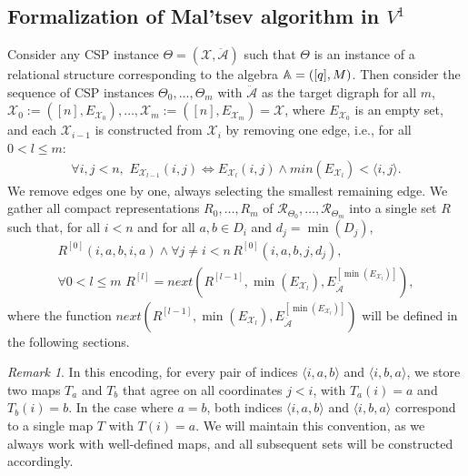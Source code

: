 \documentclass{article}
\newcommand{\A}{\ensuremath\mathbb{A}}
\theoremstyle{definition}
\theoremstyle{theorem}
\theoremstyle{theorem}
\theoremstyle{remark}
\theoremstyle{remark}
\newtheorem{rem}{Remark}
\theoremstyle{example}
\theoremstyle{notation}
\theoremstyle{theorem}
\begin{document}
\subsection{Formalization of Mal'tsev algorithm in $V^1$}\label{alskhf;shgf}

Consider any CSP instance $\Theta=(\mathcal{X},\ddot{\mathcal{A}})$ such that $\Theta$ is an instance of a relational structure corresponding to the algebra $\A=([q], M)$. Then consider the sequence of CSP instances $\Theta_0, \ldots, \Theta_m$ with $\ddot{\mathcal{A}}$ as the target digraph for all $m$,
$\mathcal{X}_0:=([n], E_{\mathcal{X}_0}), \ldots, \mathcal{X}_m:=([n], E_{\mathcal{X}_m}) = \mathcal{X}$, where $E_{\mathcal{X}_0}$ is an empty set, and each $\mathcal{X}_{i-1}$ is constructed from $\mathcal{X}_{i}$ by removing one edge, i.e., for all $0 < l \leq m$:
\begin{equation}
    \begin{gathered}
        \forall i,j<n, \,\, E_{\mathcal{X}_{l-1}}(i,j) \iff E_{\mathcal{X}_{l}}(i,j) \wedge min(E_{\mathcal{X}_l}) < \langle i,j\rangle.
    \end{gathered}
\end{equation}
We remove edges one by one, always selecting the smallest remaining edge. We gather all compact representations $R_0, \ldots, R_m$ of $\mathscr{R}_{\Theta_0}, \ldots, \mathscr{R}_{\Theta_m}$ into a single set $R$ such that, for all $i < n$ and for all $a, b \in D_i$ and $d_j = \min(D_j)$,
\begin{equation}
    \begin{gathered}\label{askjfh;ashfd}
R^{[0]}(i, a,b ,i,a)\wedge \forall j \neq i < n \, R^{[0]}( i, a,b,j,d_j), \\
\forall 0 < l \leq m\,\, R^{[l]} = next(R^{[l-1]}, \min(E_{\mathcal{X}_l}), E^{[\min(E_{\mathcal{X}_l})]}_{\ddot{\mathcal{A}}}),
    \end{gathered}
\end{equation}
where the function $next(R^{[l-1]}, \min(E_{\mathcal{X}_l}), E^{[\min(E_{\mathcal{X}_l})]}_{\ddot{\mathcal{A}}})$ will be defined in the following sections.

\begin{rem}\label{&&^*&}
In this encoding, for every pair of indices $\langle i,a,b\rangle$ and $\langle i,b,a\rangle$, we store two maps $T_a$ and $T_b$ that agree on all coordinates $j < i$, with $T_a(i) = a$ and $T_b(i) = b$. In the case where $a = b$, both indices $\langle i,a,b\rangle$ and $\langle i,b,a\rangle$ correspond to a single map $T$ with $T(i) = a$. We will maintain this convention, as we always work with well-defined maps, and all subsequent sets will be constructed accordingly.
\end{rem}
\end{document}
